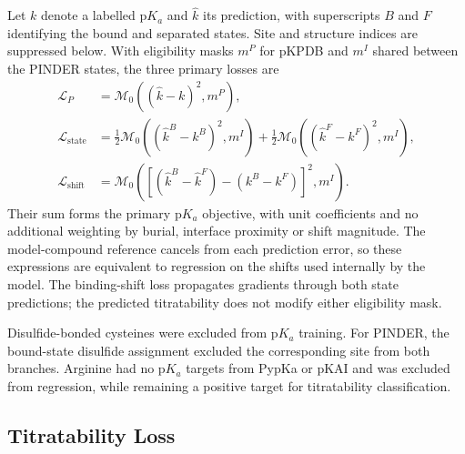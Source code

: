 Let $k$ denote a labelled $\mathrm{p}K_a$ and $\hat{k}$ its prediction, with superscripts $B$ and $F$ identifying the bound and separated states. Site and structure indices are suppressed below. With eligibility masks $m^P$ for pKPDB and $m^I$ shared between the PINDER states, the three primary losses are
\begin{equation}
    \begin{aligned}
        \mathcal L_P
        &=\mathcal M_0\!\left((\hat{k}-k)^2,m^P\right),\\
        \mathcal L_{\mathrm{state}}
        &=\tfrac12\mathcal M_0\!\left((\hat{k}^{B}-k^{B})^2,m^I\right)
          +\tfrac12\mathcal M_0\!\left((\hat{k}^{F}-k^{F})^2,m^I\right),\\
        \mathcal L_{\mathrm{shift}}
        &=\mathcal M_0\!\left(
          \left[(\hat{k}^{B}-\hat{k}^{F})-(k^{B}-k^{F})\right]^2,m^I
          \right).
    \end{aligned}
    \label{eq:jaxka-primary-losses}
\end{equation}
Their sum forms the primary $\mathrm{p}K_a$ objective, with unit coefficients and no additional weighting by burial, interface proximity or shift magnitude. The model-compound reference cancels from each prediction error, so these expressions are equivalent to regression on the shifts used internally by the model. The binding-shift loss propagates gradients through both state predictions; the predicted titratability does not modify either eligibility mask.

Disulfide-bonded cysteines were excluded from $\mathrm{p}K_a$ training. For PINDER, the bound-state disulfide assignment excluded the corresponding site from both branches. Arginine had no $\mathrm{p}K_a$ targets from PypKa or pKAI and was excluded from regression, while remaining a positive target for titratability classification.

\subsection{Titratability Loss}
\label{app:jaxka-titratability-loss}

